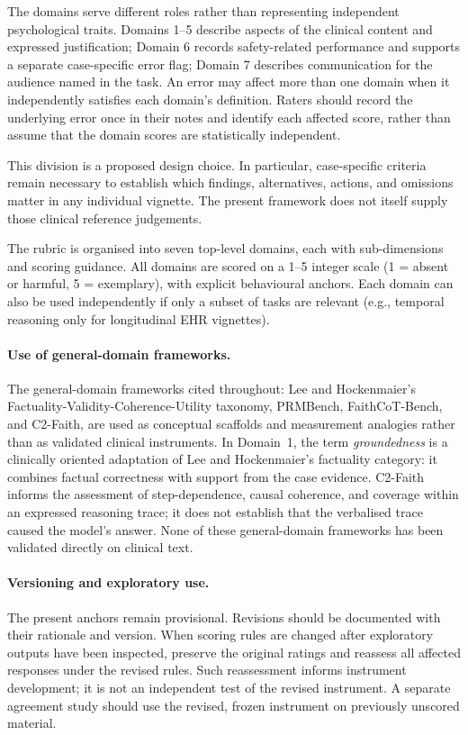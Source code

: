 \documentclass{article}
\begin{document}
The domains serve different roles rather than representing independent
psychological traits. Domains 1--5 describe aspects of the clinical
content and expressed justification; Domain 6 records safety-related
performance and supports a separate case-specific error flag; Domain 7
describes communication for the audience named in the task. An error
may affect more than one domain when it independently satisfies each
domain's definition. Raters should record the underlying error once
in their notes and identify each affected score, rather than assume
that the domain scores are statistically independent.

This division is a proposed design choice. In particular, case-specific
criteria remain necessary to establish which findings, alternatives,
actions, and omissions matter in any individual vignette. The present
framework does not itself supply those clinical reference judgements.

The rubric is organised into seven top-level domains, each with sub-dimensions and scoring guidance. All domains are scored on a 1--5 integer scale (1 = absent or harmful, 5 = exemplary), with explicit behavioural anchors. Each domain can also be used independently if only a subset of tasks are relevant (e.g., temporal reasoning only for longitudinal EHR vignettes).

\paragraph{Use of general-domain frameworks.}
The general-domain frameworks cited throughout: Lee and Hockenmaier's Factuality-Validity-Coherence-Utility taxonomy, PRMBench, FaithCoT-Bench, and C2-Faith, are used as conceptual scaffolds and measurement analogies rather than as validated clinical instruments. In Domain~1, the term \emph{groundedness} is a clinically oriented adaptation of Lee and Hockenmaier's factuality category: it combines factual correctness with support from the case evidence. C2-Faith informs the assessment of step-dependence, causal coherence, and coverage within an expressed reasoning trace; it does not establish that the verbalised trace caused the model's answer. None of these general-domain frameworks has been validated directly on clinical text.

\paragraph{Versioning and exploratory use.}
The present anchors remain provisional. Revisions should be
documented with their rationale and version. When scoring rules
are changed after exploratory outputs have been inspected,
preserve the original ratings and reassess all affected responses
under the revised rules. Such reassessment informs instrument
development; it is not an independent test of the revised
instrument. A separate agreement study should use the revised,
frozen instrument on previously unscored material.
\end{document}
